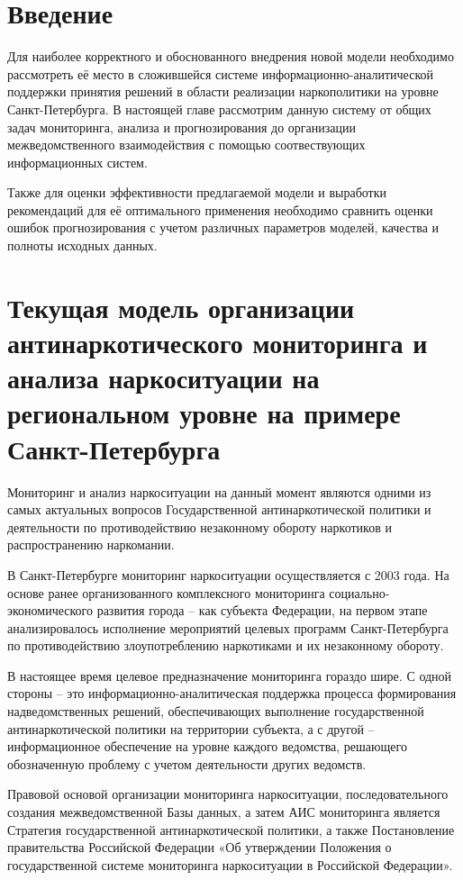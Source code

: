 \section*{Введение}
Для наиболее корректного и обоснованного внедрения новой модели необходимо
рассмотреть её место в сложившейся системе информационно-аналитической поддержки
принятия решений  в области реализации наркополитики на уровне Санкт-Петербурга.
В настоящей главе рассмотрим данную
систему от общих задач мониторинга, анализа и прогнозирования до организации
межведомственного взаимодействия с помощью соотвествующих информационных систем.

Также для оценки эффективности предлагаемой модели и выработки рекомендаций для
её оптимального применения необходимо сравнить оценки ошибок прогнозирования с
учетом различных параметров моделей, качества и полноты исходных данных.

\section{Текущая модель организации антинаркотического мониторинга и анализа
наркоситуации на региональном уровне на примере Санкт-Петербурга}

Мониторинг и анализ наркоситуации на данный момент являются одними из самых
актуальных вопросов Государственной антинаркотической политики и деятельности по
противодействию незаконному обороту наркотиков и распространению наркомании. 

В Санкт-Петербурге мониторинг наркоситуации осуществляется с 2003 года. На
основе ранее организованного комплексного мониторинга социально-экономического
развития города – как субъекта Федерации, на первом этапе  анализировалось
исполнение мероприятий целевых программ Санкт-Петербурга по противодействию
злоупотреблению наркотиками и их незаконному обороту.

В настоящее время целевое предназначение мониторинга гораздо шире. С одной
стороны – это информационно-аналитическая поддержка процесса формирования
надведомственных решений, обеспечивающих выполнение государственной
антинаркотической политики на территории субъекта, а с другой – информационное
обеспечение на уровне каждого ведомства, решающего обозначенную проблему с
учетом деятельности других ведомств.

Правовой основой организации мониторинга наркоситуации, последовательного
создания межведомственной Базы данных, а затем АИС мониторинга является
Стратегия государственной антинаркотической политики, а также Постановление
правительства Российской Федерации «Об утверждении Положения о государственной
системе мониторинга наркоситуации в Российской Федерации».

